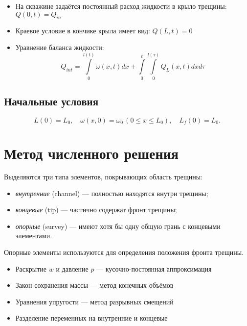 \documentclass[11pt,a4paper,russian,dvipsnames ]{article}
\begin{document}
\begin{itemize}
	\item На скважине задаётся постоянный расход жидкости в крыло трещины: $Q(0,t)=Q_{in}$
	\item Краевое условие в кончике крыла имеет вид: $Q(L,t)=0$
	\item Уравнение баланса жидкости:
	\begin{equation*}
		Q_{int} = \int \limits_{0}^{l(t)}\omega(x,t) dx + \int \limits_{0}^{t} \int \limits_{0}^{l(\tau)}Q_L(x,t) dx d\tau
	\end{equation*}
\end{itemize}

\subsection{Начальные условия}

\begin{equation}
	L(0)=L_0, \quad \omega(x,0)=\omega_0 \, (0\leq x\leq L_0), \quad L_f(0)=L_0. 
\end{equation}

\section{Метод численного решения}

Выделяются три типа элементов, покрывающих область трещины:

\begin{itemize}\setlength\itemsep{0.1em}
	\item \emph{внутренние} {\color{orange}(channel)} --- полностью находятся внутри трещины;
	\item \emph{концевые} {\color{BrickRed}(tip)} --- частично содержат фронт трещины;
	\item \emph{опорные} {\color{ForestGreen}(survey)} --- имеют хотя бы одну общую грань с концевыми элементами.	
\end{itemize}

Опорные элементы используются для определения положения фронта трещины.


\begin{itemize}\setlength\itemsep{0.1em}
	\item Раскрытие $w$ и давление $p$ --- кусочно-постоянная аппроксимация
	\item Закон сохранения массы --- метод конечных объёмов
	\item Уравнения упругости --- метод разрывных смещений
	\item Разделение переменных на внутренние и концевые 
\end{itemize}
\end{document}
